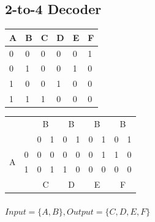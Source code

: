 \documentclass{report}
\begin{document}
            \subsection{2-to-4 Decoder}
                \begin{table}[ht]
                    \centering
                    \begin{tabular}{|l|l|l|l|l|l|}
                    \hline
                    A & B & C & D & E & F \\ \hline
                    0 & 0 & 0 & 0 & 0 & 1 \\ \hline
                    0 & 1 & 0 & 0 & 1 & 0 \\ \hline
                    1 & 0 & 0 & 1 & 0 & 0 \\ \hline
                    1 & 1 & 1 & 0 & 0 & 0 \\ \hline
                    \end{tabular}
                \end{table}
                \begin{table}[ht]
                    \centering
                    \begin{tabular}{|c|c|c|c|c|c|c|c|c|c|}
                        \hline
                        \multicolumn{2}{|c|}{\multirow{2}{*}{}} & \multicolumn{2}{c|}{B} & \multicolumn{2}{c|}{B} & \multicolumn{2}{c|}{B} & \multicolumn{2}{c|}{B} \\ \cline{3-10} 
                        \multicolumn{2}{|c|}{}                  & 0          & 1         & 0          & 1         & 0          & 1         & 0          & 1         \\ \hline
                        \multirow{2}{*}{A}          & 0         & 0          & 0         & 0          & 0         & 0          & 1         & 1          & 0         \\ \cline{2-10} 
                                                    & 1         & 0          & 1         & 1          & 0         & 0          & 0         & 0          & 0         \\ \hline
                        \multicolumn{2}{|l|}{}                  & \multicolumn{2}{c|}{C} & \multicolumn{2}{c|}{D} & \multicolumn{2}{c|}{E} & \multicolumn{2}{c|}{F} \\ \hline
                    \end{tabular}
                \end{table}
                \paragraph{$ Input=\{A, B\}, Output=\{C, D, E, F\} $}
\end{document}
